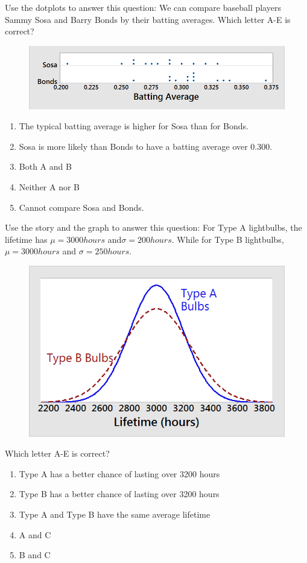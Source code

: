 \documentclass[11.5pt]{sig-alternate} %
\begin{document}
\begin{large}
Use the dotplots to answer this question: We can compare baseball players Sammy Sosa and Barry Bonds by their batting averages. Which letter A-E is correct?
 \begin{figure}[h]
     \centering
     \includegraphics[width=0.5\linewidth]{images/q2.png}
 \end{figure}
\begin{enumerate}[label=\Alph*.]
    \item The typical batting average is higher for Sosa than for Bonds.
    \item Sosa is more likely than Bonds to have a batting average over 0.300.
    \item Both A and B
    \item Neither A nor B
    \item Cannot compare Sosa and Bonds.
\end{enumerate}

Use the story and the graph to answer this question: For Type A lightbulbs, the lifetime has $\mu = 3000 hours$ and$\sigma = 200 hours$. While for Type B lightbulbs, $\mu = 3000 hours$ and $\sigma = 250 hours$. 
\begin{figure}[h]
    \centering
    \includegraphics[width=0.5\linewidth]{images/q3.png}
\end{figure}
Which letter A-E is correct?
\begin{enumerate}[label=\Alph*.]
    \item Type A has a better chance of lasting over 3200 hours
    \item Type B has a better chance of lasting over 3200 hours
    \item Type A and Type B have the same average lifetime
    \item A and C
    \item B and C
\end{enumerate}


\end{large}
\end{document}

